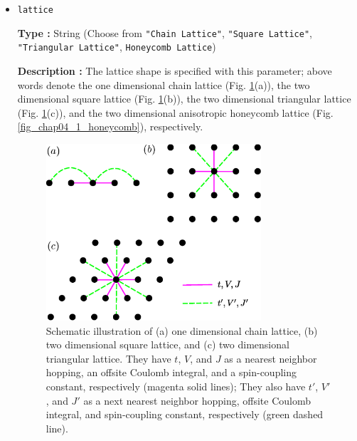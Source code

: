 \begin{itemize}
\item \verb|lattice|

{\bf Type :} String (Choose from \verb|"Chain Lattice"|, \verb|"Square Lattice"|, 
\verb|"Triangular Lattice"|, \verb|Honeycomb Lattice|)

{\bf Description :} The lattice shape is specified with this parameter;
above words denote
the one dimensional chain lattice (Fig. \ref{fig_chap04_1_lattice}(a)), 
the two dimensional square lattice (Fig. \ref{fig_chap04_1_lattice}(b)),
the two dimensional triangular lattice (Fig. \ref{fig_chap04_1_lattice}(c)),
and
the two dimensional anisotropic honeycomb lattice (Fig. \ref{fig_chap04_1_honeycomb}),
respectively.

\begin{figure}[!htbp]
  \begin{center}
    \includegraphics[width=8cm]{../figs/chap04_1_lattice.eps}
    \caption{Schematic illustration of
      (a) one dimensional chain lattice, 
      (b) two dimensional square lattice, and 
      (c) two dimensional triangular lattice.
      They have $t$, $V$, and $J$ as a nearest neighbor hopping, an offsite Coulomb integral, 
      and a spin-coupling constant, respectively (magenta solid lines);
      They also have $t'$, $V'$, and $J'$ as a next nearest neighbor hopping, offsite Coulomb integral, 
      and spin-coupling constant, respectively (green dashed line).
    }
    \label{fig_chap04_1_lattice}
  \end{center}
\end{figure}


\end{itemize}
